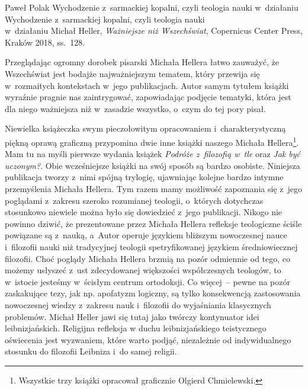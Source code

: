 \begin{recplenv}{Paweł Polak}
	{Wychodzenie z~sarmackiej kopalni, czyli teologia nauki w~działaniu}
	{Wychodzenie z~sarmackiej kopalni, czyli teologia nauki\\w~działaniu}
	{Michał Heller, \textit{Ważniejsze niż Wszechświat}, Copernicus Center Press, Kraków 2018,
		ss.~128.}




Przeglądając ogromny dorobek pisarski Michała Hellera łatwo zauważyć, że Wszechświat jest bodajże najważniejszym
tematem, który przewija się w~rozmaitych kontekstach w~jego publikacjach. Autor samym tytułem książki wyraźnie pragnie
nas zaintrygować, zapowiadając podjęcie tematyki, która jest dla niego ważniejsza niż w~zasadzie wszystko, o~czym do
tej pory pisał.

Niewielka książeczka swym pieczołowitym opracowaniem i~charakterystyczną piękną oprawą graficzną przypomina dwie
inne książki naszego Michała Hellera\footnote{Wszystkie trzy książki opracował graficznie Olgierd Chmielewski.}. Mam tu
na myśli pierwsze wydania książek \textit{Podróże z~filozofią w~tle} oraz
\textit{Jak być uczonym?}. Obie wcześniejsze książki na swój sposób są bardzo
osobiste. Niniejsza publikacja tworzy z~nimi spójną trylogię, ujawniając kolejne bardzo intymne przemyślenia Michała
Hellera. Tym razem mamy możliwość zapoznania się z~jego poglądami z~zakresu szeroko rozumianej teologii, o~których
dotychczas stosunkowo niewiele można było się dowiedzieć z~jego publikacji. Nikogo nie powinno dziwić, że prezentowane
przez Michała Hellera refleksje teologiczne ściśle powiązane są z~nauką, a~Autor operuje językiem bliższym nowoczesnej
nauce i~filozofii nauki niż tradycyjnej teologii spetryfikowanej językiem średniowiecznej filozofii. Choć poglądy
Michała Hellera brzmią na pozór odmiennie od tego, co możemy usłyszeć z~ust zdecydowanej większości współczesnych
teologów, to w~istocie jesteśmy w~ścisłym centrum ortodoksji. Co więcej~-- pewne na pozór zaskakujące tezy, jak np.
apofatyzm logiczny, są tylko konsekwencją zastosowania nowoczesnej wiedzy z~zakresu nauk i~filozofii do wyjaśniania
klasycznych problemów. Michał Heller jawi się tutaj jako twórczy kontynuator idei leibnizjańskich. Religijna refleksja
w duchu leibnizjańskiego teistycznego oświecenia jest wyzwaniem, które warto podjąć, niezależnie od indywidualnego
stosunku do filozofii Leibniza i~do samej religii.


\end{recplenv}

